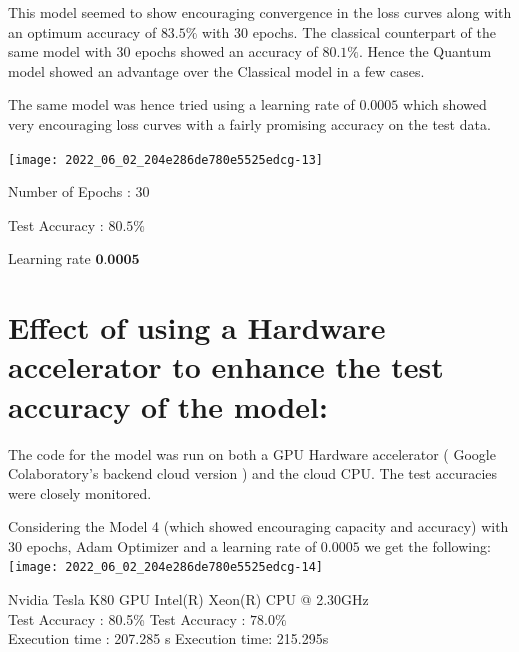 \documentclass[10pt]{article}
\begin{document}
This model seemed to show encouraging convergence in the loss curves along with an optimum accuracy of $83.5 \%$ with 30 epochs. The classical counterpart of the same model with 30 epochs showed an accuracy of $80.1 \%$. Hence the Quantum model showed an advantage over the Classical model in a few cases.

The same model was hence tried using a learning rate of $0.0005$ which showed very encouraging loss curves with a fairly promising accuracy on the test data.

\texttt{[image: 2022\_06\_02\_204e286de780e5525edcg-13]}

Number of Epochs : 30

Test Accuracy : $80.5 \%$

Learning rate $\mathbf{0 . 0 0 0 5}$
\section{Effect of using a Hardware accelerator to enhance the test accuracy of the model:}

The code for the model was run on both a GPU Hardware accelerator ( Google Colaboratory's backend cloud version ) and the cloud CPU. The test accuracies were closely monitored.

Considering the Model 4 (which showed encouraging capacity and accuracy) with 30 epochs, Adam Optimizer and a learning rate of $0.0005$ we get the following:\\

\texttt{[image: 2022\_06\_02\_204e286de780e5525edcg-14]}
  



Nvidia Tesla K80 GPU \hspace{8em}      Intel(R) Xeon(R) CPU @ 2.30GHz \\

Test Accuracy : 80.5\%  \hspace{10em}  Test Accuracy : $78.0 \%$\\

Execution time : 207.285 s \hspace{8em}   Execution time: 215.295s  


\end{document}
